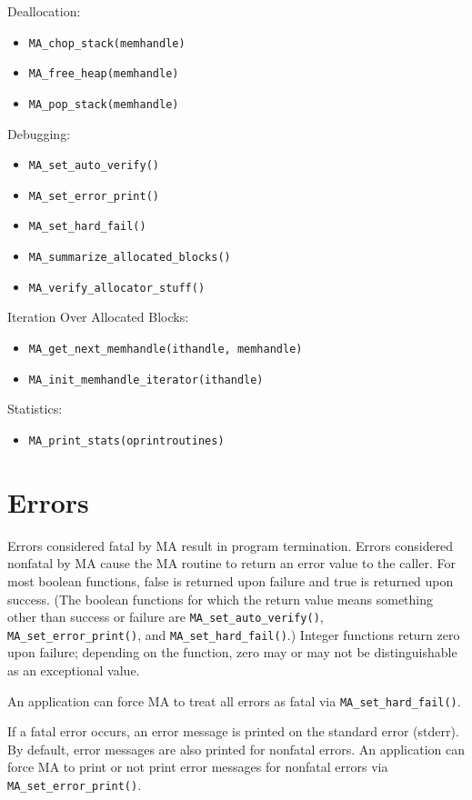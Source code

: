 Deallocation:
\begin{itemize}
\item {\tt MA\_chop\_stack(memhandle)}
\item {\tt MA\_free\_heap(memhandle)}
\item {\tt MA\_pop\_stack(memhandle)}
\end{itemize}

Debugging:
\begin{itemize}
\item {\tt MA\_set\_auto\_verify()}
\item {\tt MA\_set\_error\_print()}
\item {\tt MA\_set\_hard\_fail()}
\item {\tt MA\_summarize\_allocated\_blocks()}
\item {\tt MA\_verify\_allocator\_stuff()}
\end{itemize}

Iteration Over Allocated Blocks:
\begin{itemize}
\item {\tt MA\_get\_next\_memhandle(ithandle, memhandle)}
\item {\tt MA\_init\_memhandle\_iterator(ithandle)}
\end{itemize}

Statistics:
\begin{itemize}
\item {\tt MA\_print\_stats(oprintroutines)}
\end{itemize}


\section{Errors}

Errors considered fatal by MA result in program termination.  Errors
considered nonfatal by MA cause the MA routine to return an error
value to the caller.  For most boolean functions, false is returned
upon failure and true is returned upon success.  (The boolean
functions for which the return value means something other than
success or failure are {\tt MA\_set\_auto\_verify()}, {\tt
  MA\_set\_error\_print()}, and {\tt MA\_set\_hard\_fail()}.)  Integer
functions return zero upon failure; depending on the function, zero
may or may not be distinguishable as an exceptional value.

An application can force MA to treat all errors as fatal via
{\tt MA\_set\_hard\_fail()}.

If a fatal error occurs, an error message is printed on the standard
error (stderr).  By default, error messages are also printed for
nonfatal errors.  An application can force MA to print or not print
error messages for nonfatal errors via {\tt MA\_set\_error\_print()}.

